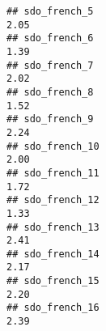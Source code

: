 \documentclass[
]{article}
\begin{document}
\begin{verbatim}
## sdo_french_5                                                                                                                                                                                                                  2.05
## sdo_french_6                                                                                                                                                                                                                  1.39
## sdo_french_7                                                                                                                                                                                                                  2.02
## sdo_french_8                                                                                                                                                                                                                  1.52
## sdo_french_9                                                                                                                                                                                                                  2.24
## sdo_french_10                                                                                                                                                                                                                 2.00
## sdo_french_11                                                                                                                                                                                                                 1.72
## sdo_french_12                                                                                                                                                                                                                 1.33
## sdo_french_13                                                                                                                                                                                                                 2.41
## sdo_french_14                                                                                                                                                                                                                 2.17
## sdo_french_15                                                                                                                                                                                                                 2.20
## sdo_french_16                                                                                                                                                                                                                 2.39

\end{verbatim}
\end{document}
